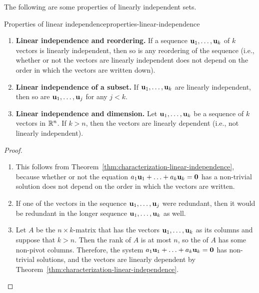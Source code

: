 The following are some properties of linearly independent sets.

\begin{theorem}{Properties of linear independence}{properties-linear-independence}
  \begin{enumerate}
  \item \textbf{Linear independence and reordering.} If a sequence
    $\mbox{\bf u}_1,\ldots,\mbox{\bf u}_k$ of $k$ vectors is linearly
    independent, then so is any reordering of the sequence (i.e.,
    whether or not the vectors are linearly independent does not
    depend on the order in which the vectors are written down).
  \item \textbf{Linear independence of a subset.} If
    $\mbox{\bf u}_1,\ldots,\mbox{\bf u}_k$ are linearly independent, then so
    are $\mbox{\bf u}_1,\ldots,\mbox{\bf u}_j$ for any $j<k$.
  \item \textbf{Linear independence and dimension.}
    \label{properties-linear-independence-c}
    Let $\mbox{\bf u}_1,\ldots,\mbox{\bf u}_k$ be a sequence of $k$ vectors in
    $\mathbb{R}^n$. If $k>n$, then the vectors are linearly dependent (i.e.,
    not linearly independent).
  \end{enumerate}
\end{theorem}

\begin{proof}
  \begin{enumerate}
  \item This follows from
    Theorem~\ref{thm:characterization-linear-independence}, because
    whether or not the equation
    $a_1\mbox{\bf u}_1 + \ldots + a_k\mbox{\bf u}_k = \mbox{\bf 0}$ has a
    non-trivial solution does not depend on the order in which the
    vectors are written.
  \item If one of the vectors in the sequence
    $\mbox{\bf u}_1,\ldots,\mbox{\bf u}_j$ were redundant, then it would be
    redundant in the longer sequence $\mbox{\bf u}_1,\ldots,\mbox{\bf u}_k$ as
    well.
  \item Let $A$ be the $n\times k$-matrix that has the vectors
    $\mbox{\bf u}_{1},\ldots,\mbox{\bf u}_{k}$ as its columns and suppose that
    $k>n$. Then the rank of $A$ is at most $n$, so the {\ef} of $A$
    has some non-pivot columns. Therefore, the system
    $a_1\mbox{\bf u}_1 + \ldots + a_k\mbox{\bf u}_k = \mbox{\bf 0}$ has
    non-trivial solutions, and the vectors are linearly dependent by
    Theorem~\ref{thm:characterization-linear-independence}.
  \end{enumerate}
\end{proof}

